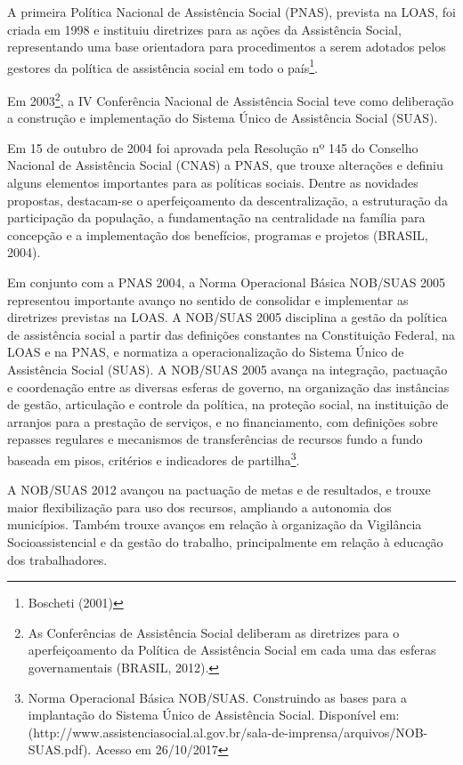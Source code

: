 \documentclass[
  brazilian]{report}
\begin{document}
A primeira Política Nacional de Assistência Social (PNAS), prevista na
LOAS, foi criada em 1998 e instituiu diretrizes para as ações da
Assistência Social, representando uma base orientadora para
procedimentos a serem adotados pelos gestores da política de assistência
social em todo o país\footnote{Boscheti (2001)}.

Em
2003\footnote{As Conferências de Assistência Social deliberam as diretrizes para o aperfeiçoamento da Política de Assistência Social em cada uma das esferas governamentais (BRASIL, 2012).},
a IV Conferência Nacional de Assistência Social teve como deliberação a
construção e implementação do Sistema Único de Assistência Social
(SUAS).

Em 15 de outubro de 2004 foi aprovada pela Resolução nº 145 do Conselho
Nacional de Assistência Social (CNAS) a PNAS, que trouxe alterações e
definiu alguns elementos importantes para as políticas sociais. Dentre
as novidades propostas, destacam-se o aperfeiçoamento da
descentralização, a estruturação da participação da população, a
fundamentação na centralidade na família para concepção e a
implementação dos benefícios, programas e projetos (BRASIL, 2004).

Em conjunto com a PNAS 2004, a Norma Operacional Básica NOB/SUAS 2005
representou importante avanço no sentido de consolidar e implementar as
diretrizes previstas na LOAS. A NOB/SUAS 2005 disciplina a gestão da
política de assistência social a partir das definições constantes na
Constituição Federal, na LOAS e na PNAS, e normatiza a operacionalização
do Sistema Único de Assistência Social (SUAS). A NOB/SUAS 2005 avança na
integração, pactuação e coordenação entre as diversas esferas de
governo, na organização das instâncias de gestão, articulação e controle
da política, na proteção social, na instituição de arranjos para a
prestação de serviços, e no financiamento, com definições sobre repasses
regulares e mecanismos de transferências de recursos fundo a fundo
baseada em pisos, critérios e indicadores de
partilha\footnote{Norma Operacional Básica NOB/SUAS. Construindo as bases para a implantação do Sistema Único de Assistência Social. Disponível em:  (http://www.assistenciasocial.al.gov.br/sala-de-imprensa/arquivos/NOB-SUAS.pdf). Acesso em 26/10/2017}.

A NOB/SUAS 2012 avançou na pactuação de metas e de resultados, e trouxe
maior flexibilização para uso dos recursos, ampliando a autonomia dos
municípios. Também trouxe avanços em relação à organização da Vigilância
Socioassistencial e da gestão do trabalho, principalmente em relação à
educação dos trabalhadores.
\end{document}
